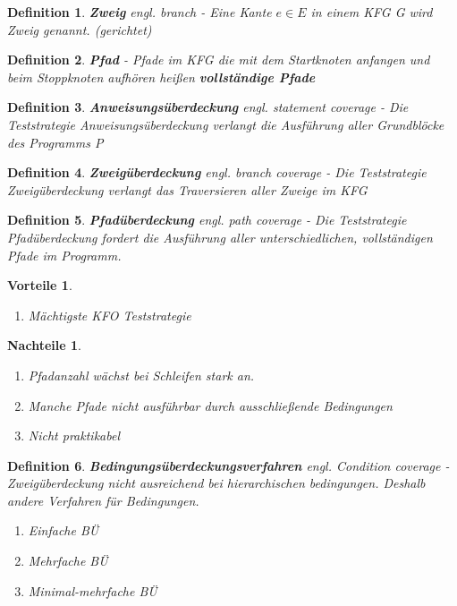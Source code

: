 \documentclass[a4paper]{article}
\theoremstyle{break}
\newtheorem{defi}{Definition}[section]
\newtheorem{why}{Vorteile}[section]
\newtheorem{whynot}{Nachteile}[section]
\begin{document}
        \begin{defi}
          \textbf{Zweig} \textit{engl. branch}  - Eine Kante \(e \in E\) in einem KFG G wird Zweig genannt. (gerichtet)
        \end{defi}

        \begin{defi}
          \textbf{Pfad} - Pfade im KFG die mit dem Startknoten anfangen und beim Stoppknoten aufhören heißen \textbf{vollständige Pfade}
        \end{defi}

        \begin{defi}
          \textbf{Anweisungsüberdeckung} \textit{engl. statement coverage} - Die Teststrategie Anweisungsüberdeckung verlangt die Ausführung aller Grundblöcke des Programms P
        \end{defi}

        \begin{defi}
          \textbf{Zweigüberdeckung} \textit{engl. branch coverage} - Die Teststrategie Zweigüberdeckung verlangt das Traversieren aller Zweige im KFG
        \end{defi}

        \begin{defi}
          \textbf{Pfadüberdeckung} \textit{engl. path coverage} - Die Teststrategie Pfadüberdeckung fordert die Ausführung aller unterschiedlichen, vollständigen Pfade im Programm.
        \end{defi}

        \begin{why}
          \begin{enumerate}
          \item Mächtigste KFO Teststrategie
          \end{enumerate}
        \end{why}
        
        \begin{whynot}
          \begin{enumerate}
          \item Pfadanzahl wächst bei Schleifen stark an.
          \item Manche Pfade nicht ausführbar durch ausschließende Bedingungen
          \item Nicht praktikabel
          \end{enumerate}
        \end{whynot}

        \begin{defi}
          \textbf{Bedingungsüberdeckungsverfahren} \textit{engl. Condition coverage} - Zweigüberdeckung nicht ausreichend bei hierarchischen bedingungen. Deshalb andere Verfahren für Bedingungen.
          \begin{enumerate}
          \item Einfache BÜ
          \item Mehrfache BÜ
          \item Minimal-mehrfache BÜ
          \end{enumerate}
        \end{defi}
\end{document}

